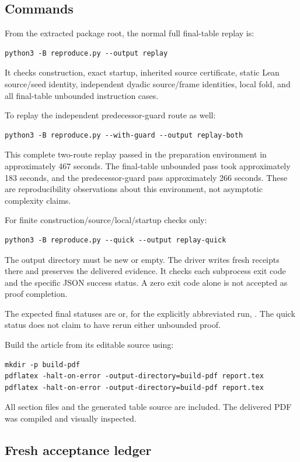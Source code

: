 \subsection{Commands}

From the extracted package root, the normal full final-table
replay is:
\begin{verbatim}
python3 -B reproduce.py --output replay
\end{verbatim}
It checks construction, exact startup, inherited source
certificate, static Lean source/seed identity, independent
dyadic source/frame identities, local fold, and all final-table
unbounded instruction cases.

To replay the independent predecessor-guard route as well:
\begin{verbatim}
python3 -B reproduce.py --with-guard --output replay-both
\end{verbatim}
This complete two-route replay passed in the preparation
environment in approximately 467 seconds. The final-table
unbounded pass took approximately 183 seconds, and the
predecessor-guard pass approximately 266 seconds. These
are reproducibility observations about this environment,
not asymptotic complexity claims.

For finite construction/source/local/startup checks only:
\begin{verbatim}
python3 -B reproduce.py --quick --output replay-quick
\end{verbatim}
The output directory must be new or empty. The driver
writes fresh receipts there and preserves the delivered
evidence. It checks each subprocess exit code and the
specific JSON success status. A zero exit code alone is
not accepted as proof completion.

The expected final statuses are
or, for the explicitly abbreviated run,
.
The quick status does not claim to have rerun either
unbounded proof.

Build the article from its editable source using:
\begin{verbatim}
mkdir -p build-pdf
pdflatex -halt-on-error -output-directory=build-pdf report.tex
pdflatex -halt-on-error -output-directory=build-pdf report.tex
\end{verbatim}
All section files and the generated table source are
included. The delivered PDF was compiled and visually
inspected.

\subsection{Fresh acceptance ledger}

